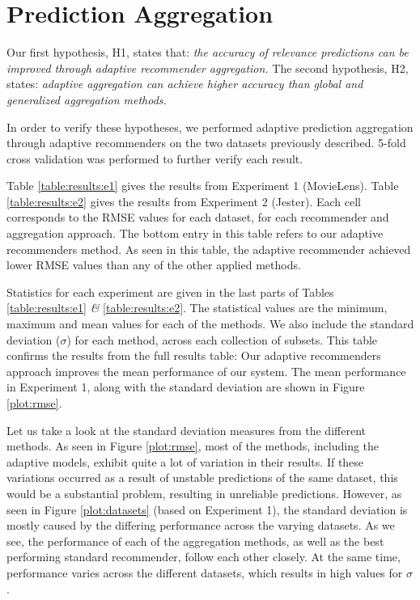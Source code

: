 \section{Prediction Aggregation}





Our first hypothesis, H1, states that:
{
  \itshape
  the accuracy of relevance predictions can be improved
  through adaptive recommender aggregation.
}
The second hypothesis, H2, states:
{
  \itshape
  adaptive aggregation can achieve higher accuracy than global and generalized aggregation methods.
}

In order to verify these hypotheses, we performed adaptive prediction aggregation
through adaptive recommenders on the two datasets previously described.
5-fold cross validation was performed to further verify each result.

Table \ref{table:results:e1} gives the results from Experiment 1 (MovieLens).
Table \ref{table:results:e2} gives the results from Experiment 2 (Jester).
Each cell corresponds to the RMSE values for each dataset,
for each recommender and aggregation approach.
The bottom entry in this table refers to our adaptive recommenders method.
As seen in this table, the adaptive recommender achieved
lower RMSE values than any of the other applied methods.

Statistics for each experiment are given in the last
parts of Tables \ref{table:results:e1} \emph{\&} \ref{table:results:e2}. 
The statistical values are the minimum, maximum and mean values
for each of the methods. We also include
the standard deviation ($\sigma$) for each method,
across each collection of subsets.
This table confirms the results from the full results table:
Our adaptive recommenders approach improves the mean performance
of our system.
The mean performance in Experiment 1, along with the standard deviation
are shown in Figure \ref{plot:rmse}.


%



Let us take a look at the standard deviation measures from the different methods.
As seen in Figure \ref{plot:rmse}, 
most of the methods, including the adaptive models,
exhibit quite a lot of variation in their results.
If these variations occurred as a result of unstable
predictions of the same dataset, this would be a substantial problem,
resulting in unreliable predictions.
However, as seen in Figure \ref{plot:datasets}
(based on Experiment 1),
the standard deviation is mostly caused by the differing
performance across the varying datasets.
As we see, the performance of each of the aggregation methods,
as well as the best performing standard recommender,
follow each other closely. At the same time,
performance varies across the different datasets,
which results in high values for $\sigma$.

